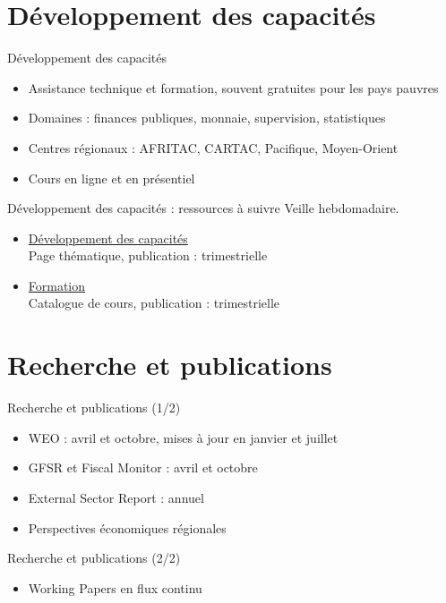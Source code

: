 \documentclass[aspectratio=169,11pt]{beamer}
\begin{document}
\section{Développement des capacités}
\begin{frame}{Développement des capacités}
\begin{itemize}
\item Assistance technique et formation, souvent gratuites pour les pays pauvres
\item Domaines : finances publiques, monnaie, supervision, statistiques
\item Centres régionaux : AFRITAC, CARTAC, Pacifique, Moyen-Orient
\item Cours en ligne et en présentiel
\end{itemize}
\end{frame}

\begin{frame}{Développement des capacités : ressources à suivre}
\small
Veille hebdomadaire.
\begin{itemize}
\item \href{https://www.imf.org/en/Capacity-Development}{Développement des capacités}\\{\footnotesize Page thématique, publication : trimestrielle}
\item \href{https://www.imf.org/en/Capacity-Development/training}{Formation}\\{\footnotesize Catalogue de cours, publication : trimestrielle}
\end{itemize}
\end{frame}

\section{Recherche et publications}
\begin{frame}{Recherche et publications (1/2)}
\begin{itemize}
\item WEO : avril et octobre, mises à jour en janvier et juillet
\item GFSR et Fiscal Monitor : avril et octobre
\item External Sector Report : annuel
\item Perspectives économiques régionales
\end{itemize}
\end{frame}

\begin{frame}{Recherche et publications (2/2)}
\begin{itemize}
\item Working Papers en flux continu
\end{itemize}
\end{frame}
\end{document}
